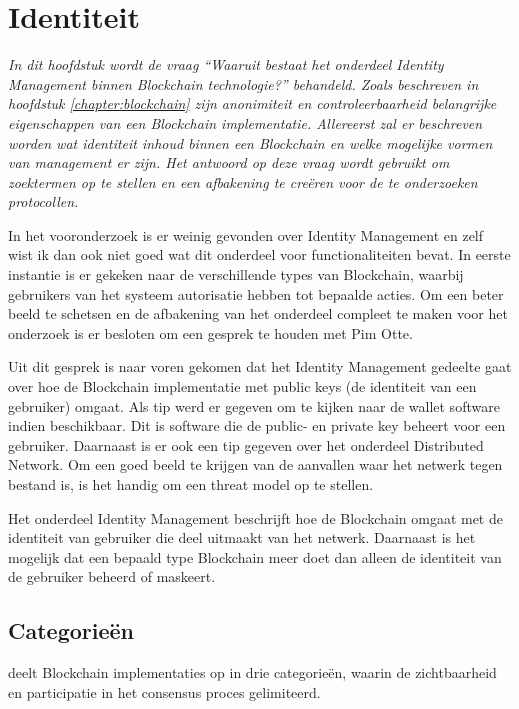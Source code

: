 \section{Identiteit}

\textit{
  In dit hoofdstuk wordt de vraag ``Waaruit bestaat het onderdeel Identity Management binnen Blockchain technologie?'' behandeld. Zoals beschreven in hoofdstuk \ref{chapter:blockchain} zijn anonimiteit en controleerbaarheid belangrijke eigenschappen van een Blockchain implementatie. Allereerst zal er beschreven worden wat identiteit inhoud binnen een Blockchain en welke mogelijke vormen van management er zijn. Het antwoord op deze vraag wordt gebruikt om zoektermen op te stellen en een afbakening te creëren voor de te onderzoeken protocollen.
}

In het vooronderzoek is er weinig gevonden over Identity Management en zelf wist ik dan ook niet goed wat dit onderdeel voor functionaliteiten bevat. In eerste instantie is er gekeken naar de verschillende types van Blockchain, waarbij gebruikers van het systeem autorisatie hebben tot bepaalde acties. Om een beter beeld te schetsen en de afbakening van het onderdeel compleet te maken voor het onderzoek is er besloten om een gesprek te houden met Pim Otte.

Uit dit gesprek is naar voren gekomen dat het Identity Management gedeelte gaat over hoe de Blockchain implementatie met public keys (de identiteit van een gebruiker) omgaat. Als tip werd er gegeven om te kijken naar de wallet software indien beschikbaar. Dit is software die de public- en private key beheert voor een gebruiker. Daarnaast is er ook een tip gegeven over het onderdeel Distributed Network. Om een goed beeld te krijgen van de aanvallen waar het netwerk tegen bestand is, is het handig om een threat model op te stellen.

Het onderdeel Identity Management beschrijft hoe de Blockchain omgaat met de identiteit van gebruiker die deel uitmaakt van het netwerk. Daarnaast is het mogelijk dat een bepaald type Blockchain meer doet dan alleen de identiteit van de gebruiker beheerd of maskeert. 

\subsection{Categorieën}

\cite{zheng2017overview} deelt Blockchain implementaties op in drie categorieën, waarin de zichtbaarheid en participatie in het consensus proces gelimiteerd.

